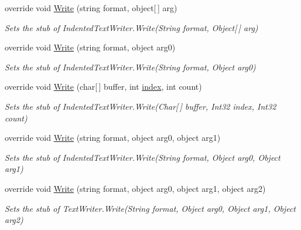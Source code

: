 \begin{DoxyCompactItemize}
override void \hyperlink{class_system_1_1_code_dom_1_1_compiler_1_1_fakes_1_1_stub_indented_text_writer_a1e0620022735536f1a0de7f633ef98c3}{Write} (string format, object\mbox{[}$\,$\mbox{]} arg)
\begin{DoxyCompactList}\small\item\em Sets the stub of Indented\-Text\-Writer.\-Write(\-String format, Object\mbox{[}$\,$\mbox{]} arg)\end{DoxyCompactList}\item 
override void \hyperlink{class_system_1_1_code_dom_1_1_compiler_1_1_fakes_1_1_stub_indented_text_writer_a0834cdc5295e5c8caf6799cb694f36c7}{Write} (string format, object arg0)
\begin{DoxyCompactList}\small\item\em Sets the stub of Indented\-Text\-Writer.\-Write(\-String format, Object arg0)\end{DoxyCompactList}\item 
override void \hyperlink{class_system_1_1_code_dom_1_1_compiler_1_1_fakes_1_1_stub_indented_text_writer_ab1b94618312ce2cf88ac88d5cc14e18f}{Write} (char\mbox{[}$\,$\mbox{]} buffer, int \hyperlink{jquery-1_810_82-vsdoc_8js_a75bb12d1f23302a9eea93a6d89d0193e}{index}, int count)
\begin{DoxyCompactList}\small\item\em Sets the stub of Indented\-Text\-Writer.\-Write(\-Char\mbox{[}$\,$\mbox{]} buffer, Int32 index, Int32 count)\end{DoxyCompactList}\item 
override void \hyperlink{class_system_1_1_code_dom_1_1_compiler_1_1_fakes_1_1_stub_indented_text_writer_a021e4c48581dfca5f96e2443c23e5439}{Write} (string format, object arg0, object arg1)
\begin{DoxyCompactList}\small\item\em Sets the stub of Indented\-Text\-Writer.\-Write(\-String format, Object arg0, Object arg1)\end{DoxyCompactList}\item 
override void \hyperlink{class_system_1_1_code_dom_1_1_compiler_1_1_fakes_1_1_stub_indented_text_writer_aaeb6084335f4ec1cc5032ab3ce88ed8e}{Write} (string format, object arg0, object arg1, object arg2)
\begin{DoxyCompactList}\small\item\em Sets the stub of Text\-Writer.\-Write(\-String format, Object arg0, Object arg1, Object arg2)\end{DoxyCompactList}\item 

\end{DoxyCompactItemize}
